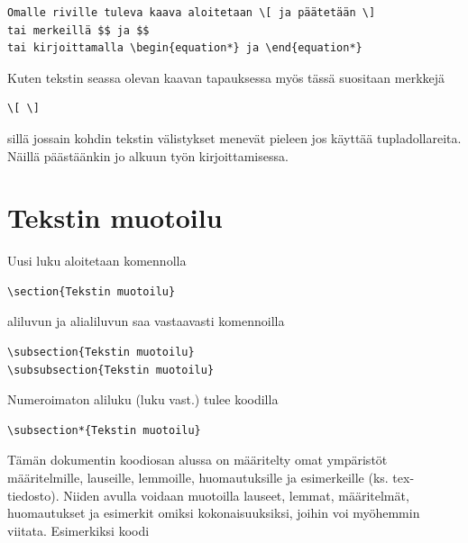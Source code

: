 \documentclass[a4paper,12 pt]{article}
\theoremstyle{plain}
\theoremstyle{definition}
\theoremstyle{remark}
\numberwithin{equation}{section}
\numberwithin{figure}{section}
\begin{document}
\begin{verbatim}
Omalle riville tuleva kaava aloitetaan \[ ja päätetään \]
tai merkeillä $$ ja $$ 
tai kirjoittamalla \begin{equation*} ja \end{equation*}
\end{verbatim}
Kuten tekstin seassa olevan kaavan tapauksessa myös tässä suositaan merkkejä

\begin{verbatim}
\[ \]
\end{verbatim}
sillä jossain kohdin tekstin välistykset menevät pieleen jos käyttää tupladollareita. Näillä päästäänkin jo alkuun työn kirjoittamisessa.

\newpage
\section{Tekstin muotoilu}
Uusi luku aloitetaan komennolla

\begin{verbatim}
\section{Tekstin muotoilu}
\end{verbatim}
aliluvun ja alialiluvun saa vastaavasti komennoilla

\begin{verbatim}
\subsection{Tekstin muotoilu}
\subsubsection{Tekstin muotoilu}
\end{verbatim}
Numeroimaton aliluku (luku vast.) tulee koodilla

\begin{verbatim}
\subsection*{Tekstin muotoilu}
\end{verbatim}

Tämän dokumentin koodiosan alussa on määritelty omat ympäristöt määritelmille, lauseille, lemmoille, huomautuksille ja esimerkeille (ks. tex-tiedosto). Niiden avulla voidaan muotoilla lauseet, lemmat, määritelmät, huomautukset ja esimerkit omiksi kokonaisuuksiksi, joihin voi myöhemmin viitata. Esimerkiksi koodi
\end{document}
